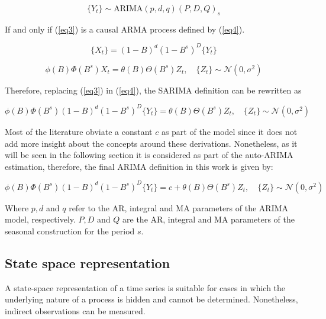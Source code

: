 \begin{equation*}
	\{Y_t\} \sim \text{ARIMA}(p,d,q)(P,D,Q)_s
\end{equation*}

If and only if (\ref{eq3}) is a causal ARMA process defined by (\ref{eq4}).

\begin{equation}\label{eq3}
	\{X_t\} = (1-B)^d (1-B^s)^D \{Y_t\}
\end{equation}

\begin{equation}\label{eq4}
	\phi(B)\Phi(B^s)X_t = \theta(B)\Theta(B^s)Z_t , \quad\{Z_t\} \sim \mathcal{N}(0,\sigma^2)
\end{equation}

Therefore, replacing (\ref{eq3}) in (\ref{eq4}), the SARIMA definition can be rewritten as

\begin{equation*}\label{eq5}
	\phi(B)\Phi(B^s)(1-B)^d (1-B^s)^D \{Y_t\} = \theta(B)\Theta(B^s)Z_t , \quad\{Z_t\} \sim \mathcal{N}(0,\sigma^2)
\end{equation*}

Most of the literature obviate a constant $c$ as part of the model since it does not add more insight about the concepts around these derivations. Nonetheless, as it will be seen in the following section it is considered as part of the auto-ARIMA estimation, therefore, the final ARIMA definition in this work is given by:

\begin{equation}\label{eq:sarima}
	\phi(B)\Phi(B^s)(1-B)^d (1-B^s)^D \{Y_t\} = c + \theta(B)\Theta(B^s)Z_t , \quad\{Z_t\} \sim \mathcal{N}(0,\sigma^2)
\end{equation}

Where $p, d$ and $q$ refer to the AR, integral and MA parameters of the ARIMA model, respectively. $P, D$ and $Q$ are the AR, integral and MA parameters of the seasonal construction for the period $s$.






\subsection{State space representation}

A state-space representation of a time series is suitable for cases in which the underlying nature of a process is hidden and cannot be determined. Nonetheless,  indirect observations can be measured.

